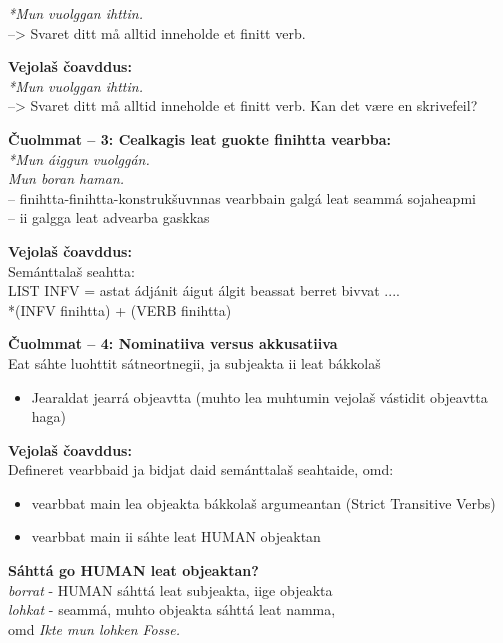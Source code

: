 \documentclass[landscape,norsk,11pt]{seminar}
\begin{document}
\begin{slide}
\textit{*Mun vuolggan ihttin.}\\
--> Svaret ditt må alltid inneholde et finitt verb. 

\newslide
\textbf{Vejolaš čoavddus:}\\

\textit{*Mun vuolggan ihttin.}\\
--> Svaret ditt må alltid inneholde et finitt verb. Kan det være en skrivefeil?


\newslide
\textbf{Čuolmmat -- 3: Cealkagis leat guokte finihtta vearbba:} \\

\textit{*Mun áiggun vuolggán.}\\
\textit{Mun boran haman.}\\
-- finihtta-finihtta-konstrukšuvnnas vearbbain galgá leat seammá sojaheapmi\\
-- ii galgga leat advearba gaskkas

\newslide
\textbf{Vejolaš čoavddus:} \\
Semánttalaš seahtta:\\
LIST INFV =  astat ádjánit áigut álgit beassat berret bivvat .... \\
\textnormal{*(INFV finihtta) + (VERB finihtta)}


\newslide
\textbf{Čuolmmat -- 4: Nominatiiva versus akkusatiiva} \\
Eat sáhte luohttit sátneortnegii, ja subjeakta ii leat bákkolaš
\begin{itemize}
\item Jearaldat jearrá objeavtta (muhto lea muhtumin vejolaš vástidit objeavtta haga)
\end{itemize}
\newslide
\textbf{Vejolaš čoavddus:} \\
Defineret vearbbaid ja bidjat daid semánttalaš seahtaide, omd: 
\begin{itemize}
\item vearbbat main lea objeakta bákkolaš argumeantan  (Strict Transitive Verbs)
\item vearbbat main ii sáhte leat HUMAN objeaktan 
\end{itemize}

\newslide
\textbf{Sáhttá go HUMAN leat objeaktan?} \\

 \textit{borrat}   - HUMAN sáhttá leat subjeakta, iige objeakta \\
 
  \textit{lohkat}  - seammá, muhto objeakta sáhttá leat namma, \\ omd   \textit{Ikte mun lohken Fosse.}


\end{slide}
\end{document}
